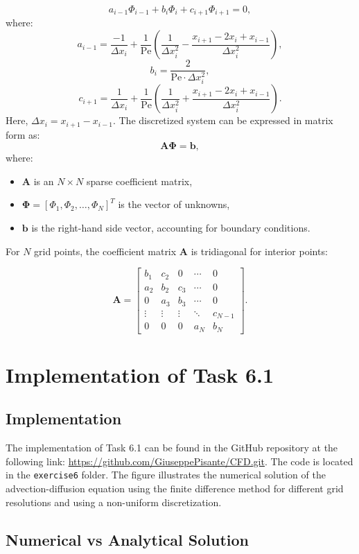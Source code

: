 \documentclass{article}
\begin{document}
\[
a_{i-1} \Phi_{i-1} + b_i \Phi_i + c_{i+1} \Phi_{i+1} = 0,
\]
where:
\[
a_{i-1} = \frac{-1}{\Delta x_i} + \frac{1}{\text{Pe}} \left( \frac{1}{\Delta x_i^2} - \frac{x_{i+1} - 2x_i + x_{i-1}}{\Delta x_i^2} \right),
\]
\[
b_i = \frac{2}{\text{Pe} \cdot \Delta x_i^2},
\]
\[
c_{i+1} = \frac{1}{\Delta x_i} + \frac{1}{\text{Pe}} \left( \frac{1}{\Delta x_i^2} + \frac{x_{i+1} - 2x_i + x_{i-1}}{\Delta x_i^2} \right).
\]
Here, \(\Delta x_i = x_{i+1} - x_{i-1}\).
The discretized system can be expressed in matrix form as:
\[
\mathbf{A} \boldsymbol{\Phi} = \mathbf{b},
\]
where:
\begin{itemize}
    \item \(\mathbf{A}\) is an \(N \times N\) sparse coefficient matrix,
    \item \(\boldsymbol{\Phi} = [\Phi_1, \Phi_2, \dots, \Phi_N]^T\) is the vector of unknowns,
    \item \(\mathbf{b}\) is the right-hand side vector, accounting for boundary conditions.
\end{itemize}
For \(N\) grid points, the coefficient matrix \(\mathbf{A}\) is tridiagonal for interior points:

\[
\mathbf{A} =
\begin{bmatrix}
b_1 & c_2 & 0 & \cdots & 0 \\
a_2 & b_2 & c_3 & \cdots & 0 \\
0 & a_3 & b_3 & \cdots & 0 \\
\vdots & \vdots & \vdots & \ddots & c_{N-1} \\
0 & 0 & 0 & a_{N} & b_{N}
\end{bmatrix}.
\]

\section{Implementation of Task 6.1}

\subsection{Implementation}

The implementation of Task 6.1 can be found in the GitHub repository at the following link: \url{https://github.com/GiuseppePisante/CFD.git}. 
The code is located in the \texttt{exercise6} folder. The figure illustrates the numerical solution of the advection-diffusion equation 
using the finite difference method for different grid resolutions and using a non-uniform discretization. 

\subsection{Numerical vs Analytical Solution}
\end{document}
